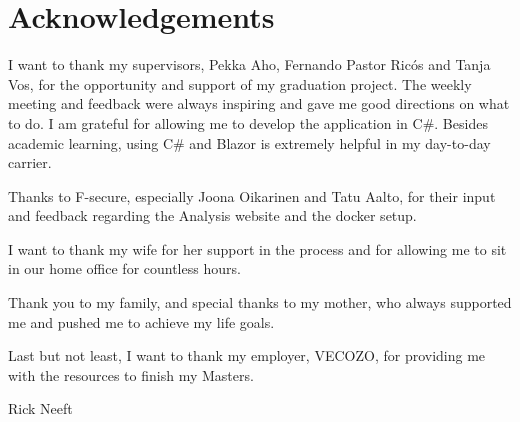\chapter*{Acknowledgements}

I want to thank my supervisors, Pekka Aho, Fernando Pastor Ricós and Tanja Vos, for the opportunity and support of my graduation project. The weekly meeting and feedback were always inspiring and gave me good directions on what to do. I am grateful for allowing me to develop the application in C\#. Besides academic learning, using C\# and Blazor is extremely helpful in my day-to-day carrier.

Thanks to F-secure, especially Joona Oikarinen and Tatu Aalto, for their input and feedback regarding the Analysis website and the docker setup.

I want to thank my wife for her support in the process and for allowing me to sit in our home office for countless hours. 

Thank you to my family, and special thanks to my mother, who always supported me and pushed me to achieve my life goals. 

Last but not least, I want to thank my employer, VECOZO, for providing me with the resources to finish my Masters. 

Rick Neeft
\myPresentationDate